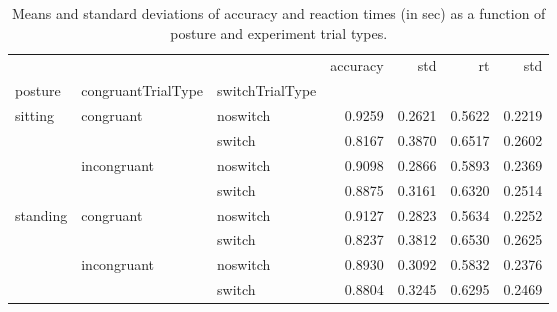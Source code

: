 \begin{table}
\centering
\caption{Means and standard deviations of accuracy and reaction times (in sec) as a function of posture and experiment trial types.}
\label{table-task-switching-replication-reaction-time}
\begin{tabular}{lllrrrr}
\toprule
         &             &        & accuracy &    std &     rt &    std \\
posture & congruantTrialType & switchTrialType &          &        &        &        \\
\midrule
sitting & congruant & noswitch &   0.9259 & 0.2621 & 0.5622 & 0.2219 \\
         &             & switch &   0.8167 & 0.3870 & 0.6517 & 0.2602 \\
         & incongruant & noswitch &   0.9098 & 0.2866 & 0.5893 & 0.2369 \\
         &             & switch &   0.8875 & 0.3161 & 0.6320 & 0.2514 \\
standing & congruant & noswitch &   0.9127 & 0.2823 & 0.5634 & 0.2252 \\
         &             & switch &   0.8237 & 0.3812 & 0.6530 & 0.2625 \\
         & incongruant & noswitch &   0.8930 & 0.3092 & 0.5832 & 0.2376 \\
         &             & switch &   0.8804 & 0.3245 & 0.6295 & 0.2469 \\
\bottomrule
\end{tabular}
\end{table}
